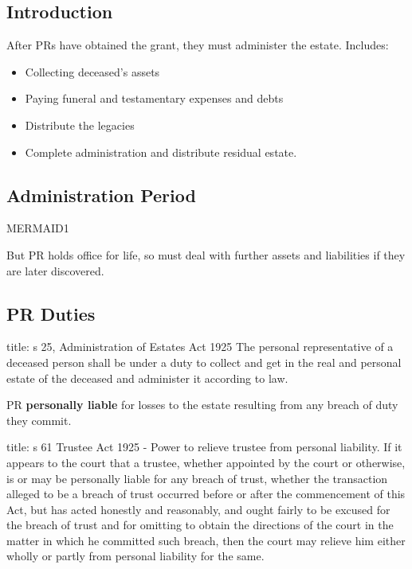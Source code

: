 \documentclass[
]{article}
\newenvironment{Shaded}{}{}
\newcommand{\NormalTok}[1]{#1}
\providecommand{\tightlist}{%
  \setlength{\itemsep}{0pt}\setlength{\parskip}{0pt}}
\begin{document}
\hypertarget{introduction-2}{%
\subsection{Introduction}\label{introduction-2}}

After PRs have obtained the grant, they must administer the estate.
Includes:

\begin{itemize}
\tightlist
\item
  Collecting deceased's assets
\item
  Paying funeral and testamentary expenses and debts
\item
  Distribute the legacies
\item
  Complete administration and distribute residual estate.
\end{itemize}

\hypertarget{administration-period}{%
\subsection{Administration Period}\label{administration-period}}

MERMAID1

But PR holds office for life, so must deal with further assets and
liabilities if they are later discovered.

\hypertarget{pr-duties}{%
\subsection{PR Duties}\label{pr-duties}}

\begin{Shaded}
\begin{Highlighting}[]
\NormalTok{title: s 25, Administration of Estates Act 1925}
\NormalTok{The personal representative of a deceased person shall be under a duty to collect and get in the real and personal estate of the deceased and administer it according to law.}
\end{Highlighting}
\end{Shaded}

PR \textbf{personally liable} for losses to the estate resulting from
any breach of duty they commit.

\begin{Shaded}
\begin{Highlighting}[]
\NormalTok{title: s 61 Trustee Act 1925 {-} Power to relieve trustee from personal liability.}
\NormalTok{If it appears to the court that a trustee, whether appointed by the court or otherwise, is or may be personally liable for any breach of trust, whether the transaction alleged to be a breach of trust occurred before or after the commencement of this Act, but has acted honestly and reasonably, and ought fairly to be excused for the breach of trust and for omitting to obtain the directions of the court in the matter in which he committed such breach, then the court may relieve him either wholly or partly from personal liability for the same. }
\end{Highlighting}
\end{Shaded}
\end{document}
